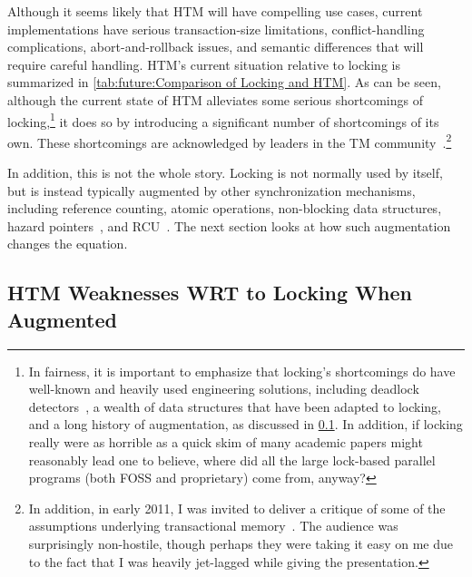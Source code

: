 

Although it seems likely that HTM will have compelling use cases,
current implementations have serious transaction-size limitations,
conflict-handling complications, abort-and-rollback issues, and
semantic differences that will require careful handling.
HTM's current situation relative to locking is summarized in
\cref{tab:future:Comparison of Locking and HTM}.
As can be seen, although the current state of HTM alleviates some
serious shortcomings of locking,\footnote{
	In fairness, it is important to emphasize that locking's shortcomings
	do have well-known and heavily used engineering solutions, including
	deadlock detectors~\cite{JonathanCorbet2006lockdep}, a wealth
	of data structures that have been adapted to locking, and
	a long history of augmentation, as discussed in
	\cref{sec:future:HTM Weaknesses WRT to Locking When Augmented}.
	In addition, if locking really were as horrible as a quick skim
	of many academic papers might reasonably lead one to believe,
	where did all the large lock-based parallel programs (both
	FOSS and proprietary) come from, anyway?}
it does so by introducing a significant
number of shortcomings of its own.
These shortcomings are acknowledged by leaders in the TM
community~\cite{AlexanderMatveev2012PessimisticTM}.\footnote{
	In addition, in early 2011, I was invited to deliver a critique of
	some of the assumptions underlying transactional
	memory~\cite{PaulEMcKenney2011Verico}.
	The audience was surprisingly non-hostile, though perhaps they
	were taking it easy on me due to the fact that I was heavily
	jet-lagged while giving the presentation.}

In addition, this is not the whole story.
Locking is not normally used by itself, but is instead typically
augmented by other synchronization mechanisms,
including reference counting, atomic operations, non-blocking data structures,
hazard pointers~\cite{MagedMichael04a,HerlihyLM02},
and RCU~\cite{McKenney98,McKenney01a,ThomasEHart2007a,PaulEMcKenney2012ELCbattery}.
The next section looks at how such augmentation changes the equation.

\subsection{HTM Weaknesses WRT to Locking When Augmented}
\label{sec:future:HTM Weaknesses WRT to Locking When Augmented}



